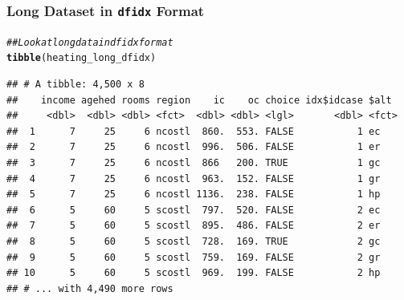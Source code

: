 \documentclass{beamer}\usepackage[]{graphicx}\usepackage[]{color}
\makeatletter
\newcommand{\hlcom}[1]{\textcolor[rgb]{0.678,0.584,0.686}{\textit{#1}}}%
\newcommand{\hlstd}[1]{\textcolor[rgb]{0.345,0.345,0.345}{#1}}%
\newcommand{\hlkwd}[1]{\textcolor[rgb]{0.737,0.353,0.396}{\textbf{#1}}}%
\newenvironment{kframe}{%
 \def\at@end@of@kframe{}%
 \ifinner\ifhmode%
  \def\at@end@of@kframe{\end{minipage}}%
  \begin{minipage}{\columnwidth}%
 \fi\fi%
 \def\FrameCommand##1{\hskip\@totalleftmargin \hskip-\fboxsep
 \colorbox{shadecolor}{##1}\hskip-\fboxsep
     \hskip-\linewidth \hskip-\@totalleftmargin \hskip\columnwidth}%
 \MakeFramed {\advance\hsize-\width
   \@totalleftmargin\z@ \linewidth\hsize
   \@setminipage}}%
 {\par\unskip\endMakeFramed%
 \at@end@of@kframe}
\newenvironment{knitrout}{}{} %
\makeatother
\begin{document}
\begin{frame}[fragile]\frametitle{Long Dataset in \texttt{dfidx} Format}
\begin{knitrout}\footnotesize
{}\color{fgcolor}\begin{kframe}
\begin{alltt}
\hlcom{## Look at long data in dfidx format}
\hlkwd{tibble}\hlstd{(heating_long_dfidx)}
\end{alltt}
\begin{verbatim}
## # A tibble: 4,500 x 8
##    income agehed rooms region    ic    oc choice idx$idcase $alt 
##     <dbl>  <dbl> <dbl> <fct>  <dbl> <dbl> <lgl>       <dbl> <fct>
##  1      7     25     6 ncostl  860.  553. FALSE           1 ec   
##  2      7     25     6 ncostl  996.  506. FALSE           1 er   
##  3      7     25     6 ncostl  866   200. TRUE            1 gc   
##  4      7     25     6 ncostl  963.  152. FALSE           1 gr   
##  5      7     25     6 ncostl 1136.  238. FALSE           1 hp   
##  6      5     60     5 scostl  797.  520. FALSE           2 ec   
##  7      5     60     5 scostl  895.  486. FALSE           2 er   
##  8      5     60     5 scostl  728.  169. TRUE            2 gc   
##  9      5     60     5 scostl  759.  169. FALSE           2 gr   
## 10      5     60     5 scostl  969.  199. FALSE           2 hp   
## # ... with 4,490 more rows
\end{verbatim}
\end{kframe}
\end{knitrout}
\end{frame}
\end{document}
